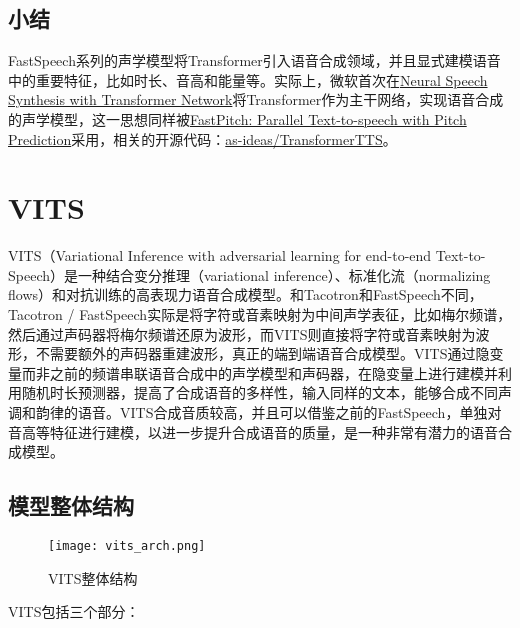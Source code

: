 \documentclass[cn,10pt,math=newtx,citestyle=gb7714-2015,bibstyle=gb7714-2015]{elegantbook}
\begin{document}
\subsection{小结}

FastSpeech系列的声学模型将Transformer引入语音合成领域，并且显式建模语音中的重要特征，比如时长、音高和能量等。实际上，微软首次在\href{https://arxiv.org/abs/1809.08895}{Neural Speech Synthesis with Transformer Network}将Transformer作为主干网络，实现语音合成的声学模型，这一思想同样被\href{https://arxiv.org/abs/2006.06873}{FastPitch: Parallel Text-to-speech with Pitch Prediction}采用，相关的开源代码：\href{https://github.com/as-ideas/TransformerTTS}{as-ideas/TransformerTTS}。

\section{VITS}

VITS（Variational Inference with adversarial learning for end-to-end Text-to-Speech）是一种结合变分推理（variational inference）、标准化流（normalizing flows）和对抗训练的高表现力语音合成模型。和Tacotron和FastSpeech不同，Tacotron / FastSpeech实际是将字符或音素映射为中间声学表征，比如梅尔频谱，然后通过声码器将梅尔频谱还原为波形，而VITS则直接将字符或音素映射为波形，不需要额外的声码器重建波形，真正的端到端语音合成模型。VITS通过隐变量而非之前的频谱串联语音合成中的声学模型和声码器，在隐变量上进行建模并利用随机时长预测器，提高了合成语音的多样性，输入同样的文本，能够合成不同声调和韵律的语音。VITS合成音质较高，并且可以借鉴之前的FastSpeech，单独对音高等特征进行建模，以进一步提升合成语音的质量，是一种非常有潜力的语音合成模型。

\subsection{模型整体结构}

\begin{figure}[htbp]
  \centering
  \texttt{[image: vits\_arch.png]}
  \caption{VITS整体结构 \label{fig:vits_arch}}
\end{figure}

VITS包括三个部分：
\end{document}
